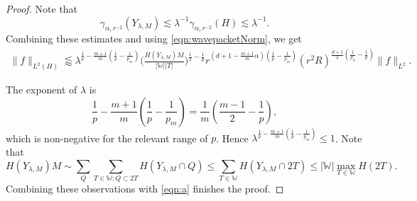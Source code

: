\documentclass[10pt,a4paper]{amsart}
\newcommand{\W}{\mathbb{W}}
\newcommand{\la}{\lambda}
\newcommand{\less}{\lessapprox}
\newcommand{\les}{\lesssim}
\begin{document}
\begin{proof}
Note that 
\[  \gamma_{\alpha,r^{-2}}(Y_{\la,M}) \les \la^{-1} \gamma_{\alpha,r^{-2}}(H) \les \la^{-1}. \]
Combining these estimates and using \eqref{eqn:wavepacketNorm}, we get
\begin{equation}\label{eqn:a}
	\begin{split}
		\| f\|_{L^2(H)} \less  \la^{\frac{1}{p}-\frac{m+1}{m}(\frac{1}{p}-\frac{1}{p_m})} \Big(\frac{H(Y_{\la,M}) M}{|\W| |T| }\Big)^{\frac{1}{2}-\frac{1}{p}} 
		r^{(d+1 - \frac{m+1}{m}\alpha)(\frac{1}{p}-\frac{1}{p_m})} (r^2 R)^{\frac{d+1}{2}(\frac{1}{p_d} -\frac{1}{p})}  \| f\|_{L^2}.
	\end{split}
\end{equation}

The exponent of $\lambda$ is
\[
\frac1p-\frac{m+1}{m}\left(\frac1p-\frac1{p_m}\right)
=
\frac1m\left(\frac{m-1}{2}-\frac1p\right),
\]
which is non-negative for the relevant range of $p$. Hence $\la^{\frac{1}{p}-\frac{m+1}{m}(\frac{1}{p}-\frac{1}{p_m})} \leq 1$. Note that
\[ H(Y_{\la,M}) M \sim \sum_{Q} \sum_{T\in \W: Q\subset 2T} H(Y_{\la,M} \cap Q) \leq  \sum_{T\in \W}  H(Y_{\la,M} \cap 2T)\leq | \W| \max_{T\in \W} H(2T). \]
Combining these observations with \eqref{eqn:a} finishes the proof.
\end{proof}
\end{document}
